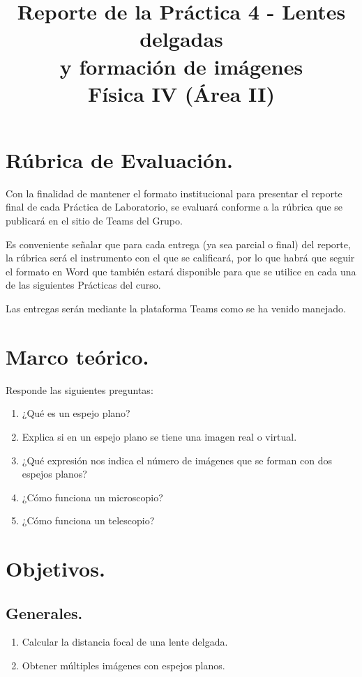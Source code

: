 \documentclass[14pt]{extarticle}
\title{\vspace*{-2cm} Reporte de la Práctica 4 - Lentes delgadas \\ y formación de imágenes \\  Física IV (Área II) \vspace{-5ex}}
\date{}
\begin{document}
\maketitle

\section{Rúbrica de Evaluación.}

Con la finalidad de mantener el formato institucional para presentar el reporte final de cada Práctica de Laboratorio, se evaluará conforme a la rúbrica que se publicará en el sitio de Teams del Grupo.
\par
Es conveniente señalar que para cada entrega (ya sea parcial o final) del reporte, la rúbrica será el instrumento con el que se calificará, por lo que habrá que seguir el formato en Word que también estará disponible para que se utilice en cada una de las siguientes Prácticas del curso.
\par
Las entregas serán mediante la plataforma Teams como se ha venido manejado.

\section{Marco teórico.}

Responde las siguientes preguntas:

\begin{enumerate}
\itemsep0.5em 
\item ¿Qué es un espejo plano?
\item Explica si en un espejo plano se tiene una imagen real o virtual.
\item ¿Qué expresión nos indica el número de imágenes que se forman con dos espejos planos?
\item ¿Cómo funciona un microscopio?
\item ¿Cómo funciona un telescopio?
\end{enumerate}

\section{Objetivos.}

\subsection{Generales.}

\begin{enumerate}
    \item Calcular la distancia focal de una lente delgada.
    \item Obtener múltiples imágenes con espejos planos.
\end{enumerate}
\end{document}
